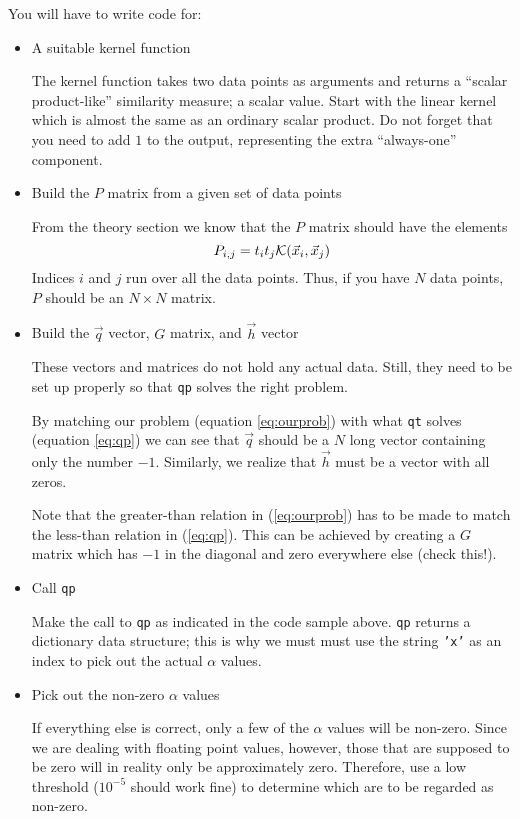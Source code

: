 \documentclass{article}
\begin{document}
You will have to write code for:
\begin{itemize}
\item A suitable kernel function

  The kernel function takes two data points as arguments and returns a
  ``scalar product-like'' similarity measure; a scalar value.  Start
  with the linear kernel which is almost the same as an ordinary
  scalar product.  Do not forget that you need to add \(1\) to the
  output, representing the extra ``always-one'' component.

\item Build the \(P\) matrix from a given set of data points

  From the theory section we know that the \(P\) matrix should have
  the elements
  \[
    P_{i,j}=t_i t_j {\cal K}(\vec{x}_i, \vec{x}_j)
  \]
  Indices \(i\) and \(j\) run over all the data points.  Thus, if you
  have \(N\) data points, \(P\) should be an \(N\times N\) matrix.

\item Build the \(\vec{q}\) vector, \(G\) matrix, and \(\vec{h}\)
  vector

  These vectors and matrices do not hold any actual data.  Still, they
  need to be set up properly so that \texttt{qp} solves the right
  problem.

  By matching our problem (equation \ref{eq:ourprob}) with what
  \texttt{qt} solves (equation \ref{eq:qp}) we can see that
  \(\vec{q}\) should be a \(N\) long vector containing only the number
  \(-1\).  Similarly, we realize that \(\vec{h}\) must be a vector
  with all zeros.

  Note that the greater-than relation in (\ref{eq:ourprob}) has to be
  made to match the less-than relation in (\ref{eq:qp}).  This can be
  achieved by creating a \(G\) matrix which has \(-1\) in the diagonal
  and zero everywhere else (check this!).

\item Call \texttt{qp}

  Make the call to \texttt{qp} as indicated in the code sample above.
  \texttt{qp} returns a dictionary data structure; this is why we must
  must use the string \texttt{'x'} as an index to pick out the actual
  \(\alpha\) values.

\item Pick out the non-zero \(\alpha\) values

  If everything else is correct, only a few of the \(\alpha\) values
  will be non-zero.  Since we are dealing with floating point values,
  however, those that are supposed to be zero will in reality only be
  approximately zero.  Therefore, use a low threshold (\(10^{-5}\)
  should work fine) to determine which are to be regarded as non-zero.


\end{itemize}
\end{document}
